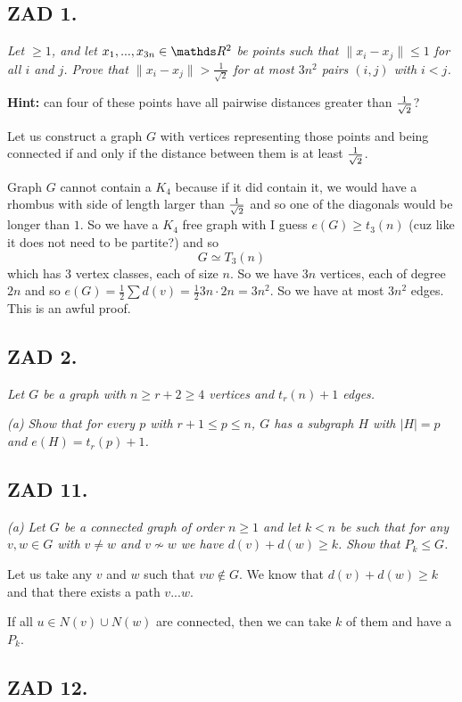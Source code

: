 \documentclass{article}[13pt]
\begin{document}
\subsection*{ZAD 1.}
\emph{Let $\geq1$, and let $x_1,...,x_{3n}\in\R^2$ be points such that $\|x_i-x_j\|\leq1$ for all $i$ and $j$. Prove that $\|x_i-x_j\|>\frac1{\sqrt{2}}$ for at most $3n^2$ pairs $(i,j)$ with $i<j$.}

\textbf{Hint:} can four of these points have all pairwise distances greater than ${1\over \sqrt{2}}$?
\medskip

Let us construct a graph $G$ with vertices representing those points and being connected if and only if the distance between them is at least ${1\over\sqrt{2}}$.

Graph $G$ cannot contain a $K_4$ because if it did contain it, we would have a rhombus with side of length larger than ${1\over\sqrt2}$ and so one of the diagonals would be longer than $1$. So we have a $K_4$ free graph with I guess $e(G)\geq t_3(n)$ (cuz like it does not need to be partite?) and so
$$G\simeq T_3(n)$$
which has $3$ vertex classes, each of size $n$. So we have $3n$ vertices, each of degree $2n$ and so $e(G)=\frac12\sum d(v)=\frac12 3n\cdot 2n=3n^2$. So we have at most $3n^2$ edges. This is an awful proof.


\subsection*{ZAD 2.}
\emph{Let $G$ be a graph with $n\geq r+2\geq 4$ vertices and $t_r(n)+1$ edges.}

\emph{(a) Show that for every $p$ with $r+1\leq p\leq n$, $G$ has a subgraph $H$ with $|H|=p$ and $e(H)=t_r(p)+1$.}
\medskip

\subsection*{ZAD 11.}
\emph{(a) Let $G$ be a connected graph of order $n\geq1$ and let $k<n$ be such that for any $v,w\in G$ with $v\neq w$ and $v\not \sim w$ we have $d(v)+d(w)\geq k$. Show that $P_k\leq G$.}
\medskip

Let us take any $v$ and $w$ such that $vw\notin G$. We know that $d(v)+d(w)\geq k$ and that there exists a path $v...w$.

If all $u\in N(v)\cup N(w)$ are connected, then we can take $k$ of them and have a $P_k$.

\subsection*{ZAD 12.}
\end{document}
